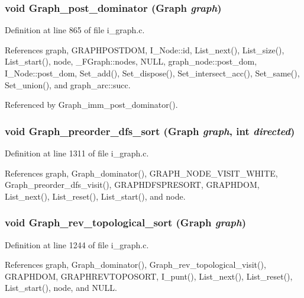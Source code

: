 \subsubsection{\setlength{\rightskip}{0pt plus 5cm}void Graph\_\-post\_\-dominator (\bf{Graph} {\em graph})}\label{i__graph_8h_8018f1ee1dd398d17963b191c5ec420a}




Definition at line 865 of file i\_\-graph.c.

References graph, GRAPHPOSTDOM, I\_\-Node::id, List\_\-next(), List\_\-size(), List\_\-start(), node, \_\-FGraph::nodes, NULL, graph\_\-node::post\_\-dom, I\_\-Node::post\_\-dom, Set\_\-add(), Set\_\-dispose(), Set\_\-intersect\_\-acc(), Set\_\-same(), Set\_\-union(), and graph\_\-arc::succ.

Referenced by Graph\_\-imm\_\-post\_\-dominator().
\subsubsection{\setlength{\rightskip}{0pt plus 5cm}void Graph\_\-preorder\_\-dfs\_\-sort (\bf{Graph} {\em graph}, int {\em directed})}\label{i__graph_8h_2670a236e7c0c5380ffd7db989c4a05f}




Definition at line 1311 of file i\_\-graph.c.

References graph, Graph\_\-dominator(), GRAPH\_\-NODE\_\-VISIT\_\-WHITE, Graph\_\-preorder\_\-dfs\_\-visit(), GRAPHDFSPRESORT, GRAPHDOM, List\_\-next(), List\_\-reset(), List\_\-start(), and node.
\subsubsection{\setlength{\rightskip}{0pt plus 5cm}void Graph\_\-rev\_\-topological\_\-sort (\bf{Graph} {\em graph})}\label{i__graph_8h_d952ed4c6047fd4d0cade5772979e3b9}




Definition at line 1244 of file i\_\-graph.c.

References graph, Graph\_\-dominator(), Graph\_\-rev\_\-topological\_\-visit(), GRAPHDOM, GRAPHREVTOPOSORT, I\_\-punt(), List\_\-next(), List\_\-reset(), List\_\-start(), node, and NULL.
